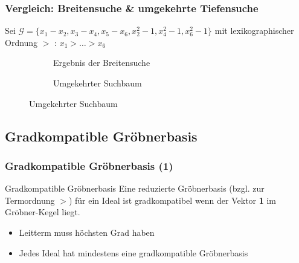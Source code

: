 \documentclass{beamer}
\begin{document}

\begin{frame}
\frametitle{Vergleich: Breitensuche \& umgekehrte Tiefensuche}

Sei $ \mathcal{G} = \{x_{1} - x_{2}, x_{3} - x_{4}, x_{5}-x_{6} , x_{2}^{2} -1 , x_{4}^{2} - 1, x_{6}^{2} - 1 \} $ mit lexikographischer Ordnung $>$ : $x_{1} > \ldots > x_{6} $


\begin{figure}[h]
    \centering
    \begin{subfigure}[b]{0.48\linewidth}        %
        \centering
        
        \caption{Ergebnis der Breitensuche}
        \label{fig:breadth}
    \end{subfigure}
    \begin{subfigure}[b]{0.48\linewidth}        %
        \centering
        
        \caption{Umgekehrter Suchbaum}
        \label{fig:reverse}
    \end{subfigure}
    \label{fig:graph}
\end{figure}

\end{frame}

\subsection{Gradkompatible Gröbnerbasis}
\begin{frame}
\frametitle{Gradkompatible Gröbnerbasis (1)}

\begin{block}{Gradkompatible Gröbnerbasis}
Eine reduzierte Gröbnerbasis (bzgl. zur Termordnung $>$) für ein Ideal ist gradkompatibel wenn der Vektor \textbf{1} im Gröbner-Kegel liegt.

\end{block}

\begin{itemize}
\item Leitterm muss höchsten Grad haben
\item Jedes Ideal hat mindestens eine gradkompatible Gröbnerbasis
\end{itemize}




\end{frame}
\end{document}
